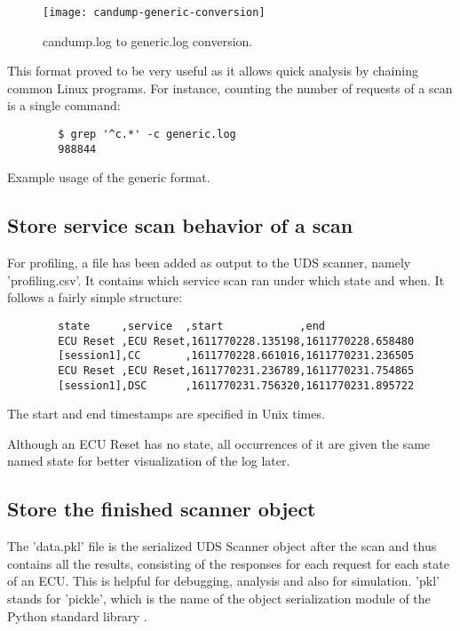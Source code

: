 \begin{figure}[htb]
    \centering
    \texttt{[image: candump-generic-conversion]}
    \caption{candump.log to generic.log conversion.}
    \label{fig:candump-generic-conversion}
\end{figure}

This format proved to be very useful as it allows quick analysis by chaining common Linux programs.
For instance, counting the number of requests of a scan is a single command:
\begin{listing}[H]
\begin{verbatim}
        $ grep '^c.*' -c generic.log
        988844
\end{verbatim}
\caption{Example usage of the generic format.}
\label{lst:usage-generic}
\end{listing}

\subsection{Store service scan behavior of a scan}

For profiling, a file has been added as output to the UDS scanner, namely 'profiling.csv'. It contains which service scan ran under which state and when. It follows a fairly simple structure:

\begin{samepage}
    \begin{verbatim}
        state     ,service  ,start            ,end
        ECU Reset ,ECU Reset,1611770228.135198,1611770228.658480
        [session1],CC       ,1611770228.661016,1611770231.236505
        ECU Reset ,ECU Reset,1611770231.236789,1611770231.754865
        [session1],DSC      ,1611770231.756320,1611770231.895722
    \end{verbatim}
\end{samepage}

The start and end timestamps are specified in Unix times.

Although an ECU Reset has no state, all occurrences of it are given the same named state for better visualization of the log later.

\subsection{Store the finished scanner object}

The 'data.pkl' file is the serialized UDS Scanner object after the scan and thus contains all the results, consisting of the responses for each request for each state of an ECU. This is helpful for debugging, analysis and also for simulation. 'pkl' stands for 'pickle', which is the name of the object serialization module of the Python standard library \cite{pickle}. 


